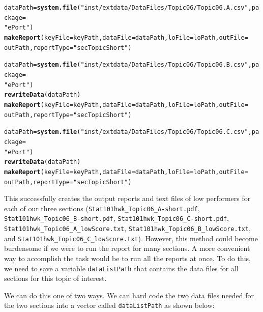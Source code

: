 \documentclass{article}\usepackage[]{graphicx}\usepackage[]{color}
\makeatletter
\newcommand{\hlstr}[1]{\textcolor[rgb]{0.192,0.494,0.8}{#1}}%
\newcommand{\hlstd}[1]{\textcolor[rgb]{0.345,0.345,0.345}{#1}}%
\newcommand{\hlkwb}[1]{\textcolor[rgb]{0.69,0.353,0.396}{#1}}%
\newcommand{\hlkwc}[1]{\textcolor[rgb]{0.333,0.667,0.333}{#1}}%
\newcommand{\hlkwd}[1]{\textcolor[rgb]{0.737,0.353,0.396}{\textbf{#1}}}%
\newenvironment{kframe}{%
 \def\at@end@of@kframe{}%
 \ifinner\ifhmode%
  \def\at@end@of@kframe{\end{minipage}}%
  \begin{minipage}{\columnwidth}%
 \fi\fi%
 \def\FrameCommand##1{\hskip\@totalleftmargin \hskip-\fboxsep
 \colorbox{shadecolor}{##1}\hskip-\fboxsep
     \hskip-\linewidth \hskip-\@totalleftmargin \hskip\columnwidth}%
 \MakeFramed {\advance\hsize-\width
   \@totalleftmargin\z@ \linewidth\hsize
   \@setminipage}}%
 {\par\unskip\endMakeFramed%
 \at@end@of@kframe}
\newenvironment{knitrout}{}{} %
\numberwithin{equation}{section} %
\makeatother
\begin{document}
\begin{knitrout}
\color{fgcolor}\begin{kframe}
\begin{alltt}
\hlstd{dataPath} \hlkwb{=} \hlkwd{system.file}\hlstd{(}\hlstr{"inst/extdata/DataFiles/Topic06/Topic06.A.csv"}\hlstd{,} \hlkwc{package} \hlstd{=}
  \hlstr{"ePort"}\hlstd{)}
\hlkwd{makeReport}\hlstd{(}\hlkwc{keyFile} \hlstd{= keyPath,} \hlkwc{dataFile} \hlstd{= dataPath,} \hlkwc{loFile} \hlstd{= loPath,} \hlkwc{outFile} \hlstd{=}
  \hlstd{outPath,} \hlkwc{reportType} \hlstd{=} \hlstr{"secTopicShort"}\hlstd{)}

\hlstd{dataPath} \hlkwb{=} \hlkwd{system.file}\hlstd{(}\hlstr{"inst/extdata/DataFiles/Topic06/Topic06.B.csv"}\hlstd{,} \hlkwc{package} \hlstd{=}
  \hlstr{"ePort"}\hlstd{)}
\hlkwd{rewriteData}\hlstd{(dataPath)}
\hlkwd{makeReport}\hlstd{(}\hlkwc{keyFile} \hlstd{= keyPath,} \hlkwc{dataFile} \hlstd{= dataPath,} \hlkwc{loFile} \hlstd{= loPath,} \hlkwc{outFile} \hlstd{=}
  \hlstd{outPath,} \hlkwc{reportType} \hlstd{=} \hlstr{"secTopicShort"}\hlstd{)}

\hlstd{dataPath} \hlkwb{=} \hlkwd{system.file}\hlstd{(}\hlstr{"inst/extdata/DataFiles/Topic06/Topic06.C.csv"}\hlstd{,} \hlkwc{package} \hlstd{=}
  \hlstr{"ePort"}\hlstd{)}
\hlkwd{rewriteData}\hlstd{(dataPath)}
\hlkwd{makeReport}\hlstd{(}\hlkwc{keyFile} \hlstd{= keyPath,} \hlkwc{dataFile} \hlstd{= dataPath,} \hlkwc{loFile} \hlstd{= loPath,} \hlkwc{outFile} \hlstd{=}
  \hlstd{outPath,} \hlkwc{reportType} \hlstd{=} \hlstr{"secTopicShort"}\hlstd{)}
\end{alltt}
\end{kframe}
\end{knitrout}

This successfully creates the output reports and text files of low performers for each of our three sections (\texttt{Stat101hwk\_Topic06\_A\--short.pdf}, \texttt{Stat101hwk\_Topic06\_B\--short.pdf}, \texttt{Stat101hwk\_Topic06\_C\--short.pdf}, \texttt{Stat101hwk\_Topic06\_A\_lowScore.txt}, \texttt{Stat101hwk\_Topic06\_B\_lowScore.txt}, and \texttt{Stat101hwk\_Topic06\_C\_lowScore.txt}). However, this method could become burdensome if we were to run the report for many sections. A more convenient way to accomplish the task would be to run all the reports at once. To do this, we need to save a variable \texttt{dataListPath} that contains the data files for all sections for this topic of interest.

We can do this one of two ways. We can hard code the two data files needed for the two sections into a vector called \texttt{dataListPath} as shown below: \\
\end{document}

